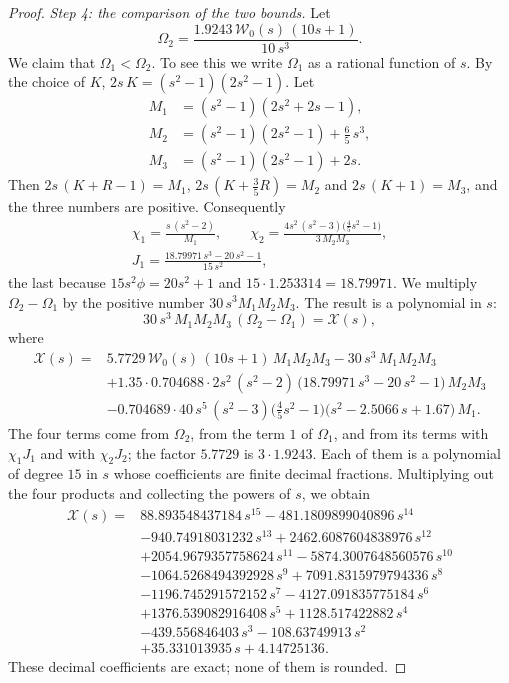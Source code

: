 \documentclass{amsart}
\theoremstyle{definition}
\theoremstyle{remark}
\numberwithin{equation}{section}
\begin{document}
\begin{proof}
\emph{Step 4: the comparison of the two bounds.}
Let
\[
\Omega_2=\frac{1.9243\,\mathcal W_0(s)\,(10s+1)}{10\,s^3}.
\]
We claim
that $\Omega_1<\Omega_2$. To see this we write $\Omega_1$ as a rational
function of $s$. By the choice of $K$, $2s\,K=(s^2-1)(2s^2-1)$. Let
\begin{align*}
M_1&=(s^2-1)(2s^2+2s-1),\\
M_2&=(s^2-1)(2s^2-1)+\tfrac65\,s^3,\\
M_3&=(s^2-1)(2s^2-1)+2s .
\end{align*}
Then $2s\,(K+R-1)=M_1$, $2s\,(K+\frac35R)=M_2$ and
$2s\,(K+1)=M_3$, and the three numbers are positive. Consequently
\begin{gather*}
\chi_1=\frac{s\,(s^2-2)}{M_1},\qquad
\chi_2=\frac{4s^2\,(s^2-3)\bigl(\frac45s^2-1\bigr)}{3\,M_2M_3},\\
J_1=\frac{18.79971\,s^3-20\,s^2-1}{15\,s^2},
\end{gather*}
the last because $15s^2\phi=20s^2+1$ and $15\cdot1.253314=18.79971$. We
multiply $\Omega_2-\Omega_1$ by the positive number
$30\,s^3M_1M_2M_3$. The result is a polynomial in $s$:
\[
30\,s^3\,M_1M_2M_3\,(\Omega_2-\Omega_1)=\mathcal X(s),
\]
where
\begin{align*}
\mathcal X(s)={}&5.7729\,\mathcal W_0(s)\,(10s+1)\,M_1M_2M_3
-30\,s^3\,M_1M_2M_3\\
&+1.35\cdot0.704688\cdot2s^2\,(s^2-2)\,
\bigl(18.79971\,s^3-20\,s^2-1\bigr)\,M_2M_3\\
&-0.704689\cdot40\,s^5\,(s^2-3)\bigl(\tfrac45s^2-1\bigr)
\bigl(s^2-2.5066\,s+1.67\bigr)\,M_1 .
\end{align*}
The four terms come from $\Omega_2$, from the term $1$ of $\Omega_1$, and
from its terms with $\chi_1J_1$ and with $\chi_2J_2$; the factor $5.7729$ is
$3\cdot1.9243$. Each of them is a polynomial of degree $15$ in $s$ whose
coefficients are finite decimal fractions. Multiplying out the four
products and collecting the powers
of $s$, we obtain
\begin{align*}
\mathcal X(s)={}&88.893548437184\,s^{15}-481.1809899040896\,s^{14}\\
&-940.74918031232\,s^{13}+2462.6087604838976\,s^{12}\\
&+2054.9679357758624\,s^{11}-5874.3007648560576\,s^{10}\\
&-1064.5268494392928\,s^{9}+7091.8315979794336\,s^{8}\\
&-1196.745291572152\,s^{7}-4127.091835775184\,s^{6}\\
&+1376.539082916408\,s^{5}+1128.517422882\,s^{4}\\
&-439.556846403\,s^{3}-108.63749913\,s^{2}\\
&+35.331013935\,s+4.14725136 .
\end{align*}
These decimal coefficients are exact; none of them is rounded.


\end{proof}
\end{document}
